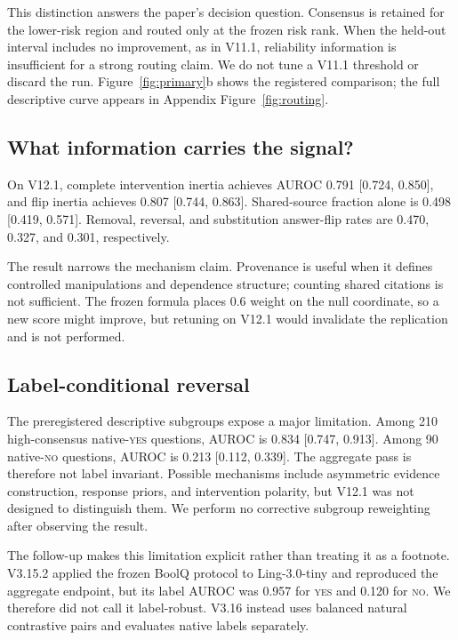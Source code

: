 \documentclass[11pt]{article}
\newcommand{\yes}{\textsc{yes}}
\newcommand{\no}{\textsc{no}}
\begin{document}
This distinction answers the paper's decision question. Consensus is retained for the lower-risk region and routed only at the frozen risk rank. When the held-out interval includes no improvement, as in V11.1, reliability information is insufficient for a strong routing claim. We do not tune a V11.1 threshold or discard the run. Figure~\ref{fig:primary}b shows the registered comparison; the full descriptive curve appears in Appendix Figure~\ref{fig:routing}.

\subsection{What information carries the signal?}

On V12.1, complete intervention inertia achieves AUROC 0.791 [0.724, 0.850], and flip inertia achieves 0.807 [0.744, 0.863]. Shared-source fraction alone is 0.498 [0.419, 0.571]. Removal, reversal, and substitution answer-flip rates are 0.470, 0.327, and 0.301, respectively.

The result narrows the mechanism claim. Provenance is useful when it defines controlled manipulations and dependence structure; counting shared citations is not sufficient. The frozen formula places 0.6 weight on the null coordinate, so a new score might improve, but retuning on V12.1 would invalidate the replication and is not performed.

\subsection{Label-conditional reversal}

The preregistered descriptive subgroups expose a major limitation. Among 210 high-consensus native-\yes{} questions, AUROC is 0.834 [0.747, 0.913]. Among 90 native-\no{} questions, AUROC is 0.213 [0.112, 0.339]. The aggregate pass is therefore not label invariant. Possible mechanisms include asymmetric evidence construction, response priors, and intervention polarity, but V12.1 was not designed to distinguish them. We perform no corrective subgroup reweighting after observing the result.

The follow-up makes this limitation explicit rather than treating it as a footnote. V3.15.2 applied the frozen BoolQ protocol to Ling-3.0-tiny and reproduced the aggregate endpoint, but its label AUROC was 0.957 for \yes{} and 0.120 for \no{}. We therefore did not call it label-robust. V3.16 instead uses balanced natural contrastive pairs and evaluates native labels separately.
\end{document}
